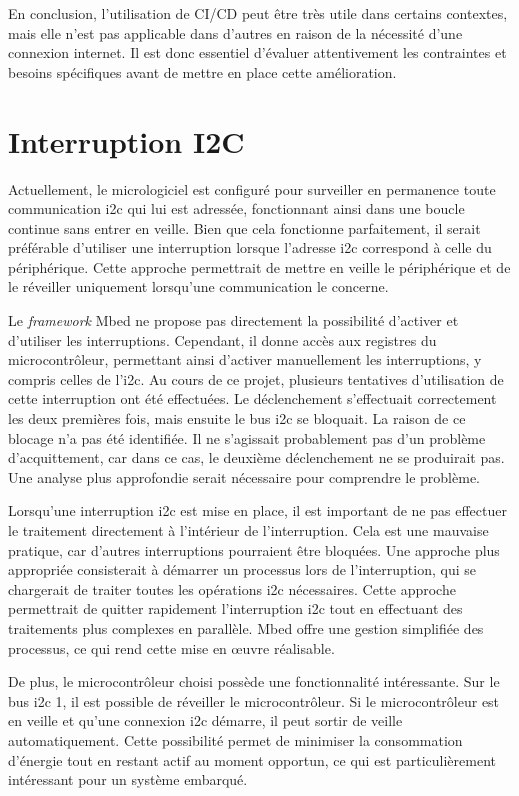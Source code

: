 En conclusion, l'utilisation de CI/CD peut être très utile dans certains contextes, mais elle n'est pas applicable dans d'autres en raison de la nécessité d'une connexion internet.
Il est donc essentiel d'évaluer attentivement les contraintes et besoins spécifiques avant de mettre en place cette amélioration.

\section{Interruption I2C}

Actuellement, le micrologiciel est configuré pour surveiller en permanence toute communication \gls{i2c} qui lui est adressée, fonctionnant ainsi dans une boucle continue sans entrer en veille.
Bien que cela fonctionne parfaitement, il serait préférable d'utiliser une interruption lorsque l'adresse \gls{i2c} correspond à celle du périphérique.
Cette approche permettrait de mettre en veille le périphérique et de le réveiller uniquement lorsqu'une communication le concerne.

Le \textit{\gls{framework}} Mbed ne propose pas directement la possibilité d'activer et d'utiliser les interruptions.
Cependant, il donne accès aux registres du microcontrôleur, permettant ainsi d'activer manuellement les interruptions, y compris celles de l'\gls{i2c}.
Au cours de ce projet, plusieurs tentatives d'utilisation de cette interruption ont été effectuées.
Le déclenchement s'effectuait correctement les deux premières fois, mais ensuite le bus \gls{i2c} se bloquait.
La raison de ce blocage n'a pas été identifiée.
Il ne s'agissait probablement pas d'un problème d'acquittement, car dans ce cas, le deuxième déclenchement ne se produirait pas.
Une analyse plus approfondie serait nécessaire pour comprendre le problème.

Lorsqu'une interruption \gls{i2c} est mise en place, il est important de ne pas effectuer le traitement directement à l'intérieur de l'interruption.
Cela est une mauvaise pratique, car d'autres interruptions pourraient être bloquées.
Une approche plus appropriée consisterait à démarrer un processus lors de l'interruption, qui se chargerait de traiter toutes les opérations \gls{i2c} nécessaires.
Cette approche permettrait de quitter rapidement l'interruption \gls{i2c} tout en effectuant des traitements plus complexes en parallèle.
Mbed offre une gestion simplifiée des processus, ce qui rend cette mise en \oe{}uvre réalisable.

De plus, le microcontrôleur choisi possède une fonctionnalité intéressante.
Sur le bus \gls{i2c} 1, il est possible de réveiller le microcontrôleur. Si le microcontrôleur est en veille et qu'une connexion \gls{i2c} démarre, il peut sortir de veille automatiquement.
Cette possibilité permet de minimiser la consommation d'énergie tout en restant actif au moment opportun, ce qui est particulièrement intéressant pour un système embarqué.

